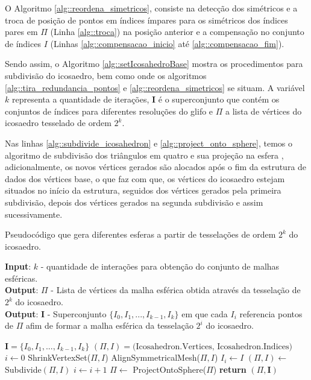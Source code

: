 O Algoritmo \ref{alg::reordena_simetricos}, consiste na detecção dos simétricos e a troca de posição de pontos em índices ímpares para os simétricos dos índices pares em $\Pi$ (Linha \ref{alg::troca}) na posição anterior e a compensação no conjunto de índices $I$ (Linhas \ref{alg::compensacao_inicio} até \ref{alg::compensacao_fim}).

Sendo assim, o Algoritmo \ref{alg::setIcosahedroBase} mostra os procedimentos para subdivisão do icosaedro, bem como onde os algoritmos \ref{alg::tira_redundancia_pontos} e \ref{alg::reordena_simetricos} se situam. A variável $k$ representa a quantidade de iterações, $\mathbf{I}$ é o superconjunto que contém os conjuntos de índices para diferentes resoluções do glifo e $\Pi$ a lista de vértices do icosaedro tesselado de ordem $2^k$.

Nas linhas \ref{alg::subdivide_icosahedron} e \ref{alg::project_onto_sphere}, temos o algoritmo de subdivisão dos triângulos em quatro e sua projeção na esfera \cite{luna2012}, adicionalmente, os novos vértices gerados são alocados após o fim da estrutura de dados dos vértices base, o que faz com que, os vértices do icosaedro estejam situados no início da estrutura, seguidos dos vértices gerados pela primeira subdivisão, depois dos vértices gerados na segunda subdivisão e assim sucessivamente.

 \begin{algorithm}
 \caption{Pseudocódigo que gera diferentes esferas a partir de tesselações de ordem $2^k$ do icosaedro.}
 \label{alg::setIcosahedroBase}
\hspace*{\algorithmicindent} \textbf{Input}: $k$ - quantidade de interações para obtenção do conjunto de malhas esféricas. \\
\hspace*{\algorithmicindent} \textbf{Output}: $\Pi$ - Lista de vértices da malha esférica obtida através da tesselação de $2^k$ do icosaedro. \\
\hspace*{\algorithmicindent} \textbf{Output}: $\mathbf{I}$ - Superconjunto $\{I_0, I_1, ..., I_{k-1}, I_k\}$ em que cada $I_i$ referencia pontos de $\Pi$ afim de formar a malha esférica da tesselação $2^i$ do icosaedro.
 \begin{algorithmic}[1]
 \State $\mathbf{I} = \{I_0, I_1, ..., I_{k-1}, I_k\}$
 \State $(\Pi, I) = \text{(Icosahedron.Vertices, Icosahedron.Indices)}$  \cite{luna2012} \label{alg::init_icosahedron}
 \State $i \gets 0$
    \State ShrinkVertexSet($\Pi, I$)
    \State AlignSymmetricalMesh($\Pi, I$)
    \State $I_i \gets I$
    \State $(\Pi, I) \gets$ Subdivide$(\Pi, I)$ \cite{luna2012}  \label{alg::subdivide_icosahedron}
    \State $i \gets i + 1$
\EndWhile
    \State $\Pi \gets$ ProjectOntoSphere($\Pi$) \cite{luna2012} \label{alg::project_onto_sphere}
    \State \textbf{return} $(\Pi, \mathbf{I})$
 \EndFunction
 \end{algorithmic}
 \end{algorithm}
 

